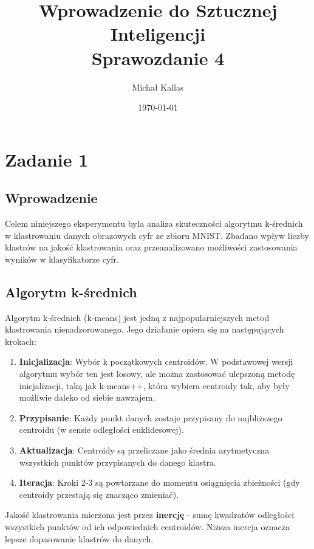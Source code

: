\documentclass[12pt,a4paper]{article}
\title{Wprowadzenie do Sztucznej Inteligencji\\Sprawozdanie 4}
\author{Michał Kallas}
\date{\today}
\begin{document}
\maketitle

\section{Zadanie 1}

\subsection{Wprowadzenie}

Celem niniejszego eksperymentu była analiza skuteczności algorytmu k-średnich w klastrowaniu danych obrazowych cyfr ze zbioru MNIST. Zbadano wpływ liczby klastrów na jakość klastrowania oraz przeanalizowano możliwości zastosowania wyników w klasyfikatorze cyfr.

\subsection{Algorytm k-średnich}

Algorytm k-średnich (k-means) jest jedną z najpopularniejszych metod klastrowania nienadzorowanego. Jego działanie opiera się na następujących krokach:

\begin{enumerate}
    \item \textbf{Inicjalizacja}: Wybór k początkowych centroidów. W podstawowej wersji algorytmu wybór ten jest losowy, ale można zastosować ulepszoną metodę inicjalizacji, taką jak k-means++, która wybiera centroidy tak, aby były możliwie daleko od siebie nawzajem.
    
    \item \textbf{Przypisanie}: Każdy punkt danych zostaje przypisany do najbliższego centroidu (w sensie odległości euklidesowej).
    
    \item \textbf{Aktualizacja}: Centroidy są przeliczane jako średnia arytmetyczna wszystkich punktów przypisanych do danego klastra.
    
    \item \textbf{Iteracja}: Kroki 2-3 są powtarzane do momentu osiągnięcia zbieżności (gdy centroidy przestają się znacząco zmieniać).
\end{enumerate}

\noindent Jakość klastrowania mierzona jest przez \textbf{inercję} - sumę kwadratów odległości wszystkich punktów od ich odpowiednich centroidów. Niższa inercja oznacza lepsze dopasowanie klastrów do danych.
\end{document}
